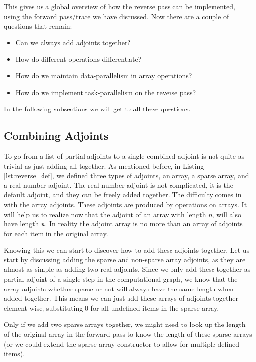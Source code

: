        This gives us a global overview of how the reverse pass can be implemented, using the forward pass/trace we have discussed.
        Now there are a couple of questions that remain:
        \begin{itemize}
            \item Can we always add adjoints together?
            \item How do different operations differentiate?
            \item How do we maintain data-parallelism in array operations?
            \item How do we implement task-parallelism on the reverse pass? 
        \end{itemize}
        In the following subsections we will get to all these questions.

    \subsection{Combining Adjoints}
        To go from a list of partial adjoints to a single combined adjoint is not quite as trivial as just adding all together.
        As mentioned before, in Listing \ref{lst:reverse_def}, we defined three types of adjoints, an array, a sparse array, and a real number adjoint.
        The real number adjoint is not complicated, it is the default adjoint, and they can be freely added together.
        The difficulty comes in with the array adjoints.
        These adjoints are produced by operations on arrays.
        It will help us to realize now that the adjoint of an array with length $n$, will also have length $n$.
        In reality the adjoint array is no more than an array of adjoints for each item in the original array.

        Knowing this we can start to discover how to add these adjoints together.
        Let us start by discussing adding the sparse and non-sparse array adjoints, as they are almost as simple as adding two real adjoints.
        Since we only add these together as partial adjoint of a single step in the computational graph, we know that the array adjoints whether sparse or not will always have the same length when added together.
        This means we can just add these arrays of adjoints together element-wise, substituting $0$ for all undefined items in the sparse array.

        Only if we add two sparse arrays together, we might need to look up the length of the original array in the forward pass to know the length of these sparse arrays (or we could extend the sparse array constructor to allow for multiple defined items).

